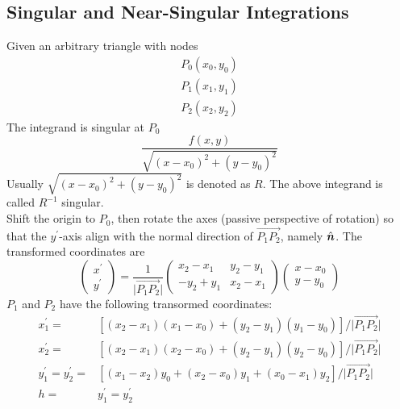 \documentclass [10pt,letterpaper]{article}
\newcommand{\unitvectorsym}[1]{\hat{\vectorsym{#1}}}
\begin{document}
\subsection{Singular and Near-Singular Integrations}
\label{subsec:singular-and-near-singular-integrations}
Given an arbitrary triangle with nodes
\begin{equation*}
	\begin{split}
		P_0(x_0,y_0)
		\\
		P_1(x_1,y_1)
		\\
		P_2(x_2,y_2) 
	\end{split}
\end{equation*}
The integrand is singular at $P_0$
\begin{equation} \label{eq:singular-near-singular-integrand-2D}
	\frac{ f(x,y) }{ \sqrt{(x-x_0)^2+(y-y_0)^2} }
\end{equation}
Usually $\sqrt{(x-x_0)^2+(y-y_0)^2}$ is denoted as $R$. 
The above integrand is called $R^{-1}$ singular.
\\
Shift the origin to $P_0$, then rotate the axes (passive perspective of rotation) so that the $y^{\prime}$-axis align with the normal direction of $\overrightarrow{P_1 P_2}$, namely $\unitvectorsym{n}$.
The transformed coordinates are
\begin{equation} \label{eq:singular-near-singular-rotate}
	\begin{pmatrix}
		x^{\prime}					\\
		y^{\prime}					
	\end{pmatrix}
	=
	\frac{1}{\lvert \overrightarrow{P_1 P_2} \rvert}
	\begin{pmatrix} 
		x_2-x_1 	& 	y_2-y_1		\\
		-y_2+y_1 	& 	x_2-x_1		
	\end{pmatrix}
	\begin{pmatrix}
		x-x_0					\\
		y-y_0
	\end{pmatrix}
\end{equation}
$P_1$ and $P_2$ have the following transormed coordinates:
\begin{subequations} \label{eq:result-singular-near-singular-x1p-x2p-y1p-y2p}
	\begin{align}
		x_1^{\prime}	
		=&	
		[
			(x_2-x_1)(x_1-x_0)
			+ 
			(y_2-y_1)(y_1-y_0)
		]
		/{\lvert \overrightarrow{P_1 P_2} \rvert}
		\\ 
		x_2^{\prime}	
		=&	
		[
			(x_2-x_1)(x_2-x_0)
			+ 
			(y_2-y_1)(y_2-y_0)
		]
		/{\lvert \overrightarrow{P_1 P_2} \rvert}
		\\
		y_1^{\prime}
		=y_2^{\prime}
		=& 
		[
			(x_1-x_2)y_0
			+
			(x_2-x_0)y_1
			+
			(x_0-x_1)y_2 
		]
		/{\lvert \overrightarrow{P_1 P_2} \rvert}
		\\
		h
		=&
		y_1^{\prime}
		=
		y_2^{\prime}
	\end{align}
\end{subequations}
\end{document}
